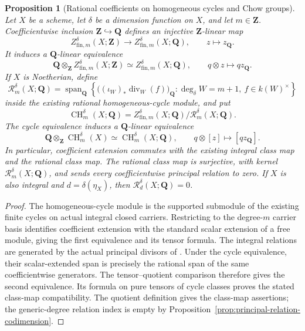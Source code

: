\documentclass[11pt]{article}
\newtheorem{proposition}[theorem]{Proposition}
\theoremstyle{definition}
\theoremstyle{remark}
\begin{document}
\begin{proposition}[Rational coefficients on homogeneous cycles and Chow groups]
\label{prop:rational-chow-coefficients}
Let \(X\) be a scheme, let \(\delta\) be a dimension function on
\(X\), and let \(m\in\mathbf Z\). Coefficientwise inclusion
\(\mathbf Z\hookrightarrow\mathbf Q\) defines an injective
\(\mathbf Z\)-linear map
\[
 Z^\delta_{\mathrm{fin},m}(X;\mathbf Z)
    \longrightarrow Z^\delta_{\mathrm{fin},m}(X;\mathbf Q),
 \qquad z\longmapsto z_{\mathbf Q}.
\]
It induces a \(\mathbf Q\)-linear equivalence
\[
 \mathbf Q\otimes_{\mathbf Z}Z^\delta_{\mathrm{fin},m}(X;\mathbf Z)
    \simeq Z^\delta_{\mathrm{fin},m}(X;\mathbf Q),
 \qquad q\otimes z\longmapsto qz_{\mathbf Q}.
\]
If \(X\) is Noetherian, define
\[
 \mathcal R_m^\delta(X;\mathbf Q)
   =\operatorname{span}_{\mathbf Q}
     \left\{\bigl((\iota_W)_*\operatorname{div}_W(f)\bigr)_{\mathbf Q}:
        \deg_\delta W=m+1,\ f\in k(W)^\times\right\}
\]
inside the existing rational homogeneous-cycle module, and put
\[
 \operatorname{CH}_m^\delta(X;\mathbf Q)
    =Z^\delta_{\mathrm{fin},m}(X;\mathbf Q)/
       \mathcal R_m^\delta(X;\mathbf Q).
\]
The cycle equivalence induces a \(\mathbf Q\)-linear equivalence
\[
 \mathbf Q\otimes_{\mathbf Z}\operatorname{CH}_m^\delta(X)
     \simeq \operatorname{CH}_m^\delta(X;\mathbf Q),
 \qquad q\otimes[z]\longmapsto[qz_{\mathbf Q}].
\]
In particular, coefficient extension commutes with the existing
integral class map and the rational class map.
The rational class map is surjective, with kernel
\(\mathcal R_m^\delta(X;\mathbf Q)\), and sends every
coefficientwise principal relation to zero. If \(X\) is also
integral and \(d=\delta(\eta_X)\), then
\(\mathcal R_d^\delta(X;\mathbf Q)=0\).
\end{proposition}

\begin{proof}
The homogeneous-cycle module is the supported submodule of the
existing finite cycles on actual integral closed carriers. Restricting
to the degree-\(m\) carrier basis identifies coefficient extension
with the standard scalar extension of a free module, giving the
first equivalence and its tensor formula. The integral relations
are generated by the actual principal divisors of
\cite{StacksRationalEquivalence}. Under the cycle equivalence,
their scalar-extended span is precisely the rational span of the
same coefficientwise generators. The tensor--quotient comparison
therefore gives the second equivalence. Its formula on pure tensors
of cycle classes proves the stated class-map compatibility.
The quotient definition gives the class-map assertions; the
generic-degree relation index is empty by
Proposition~\ref{prop:principal-relation-codimension}.
\end{proof}
\end{document}
